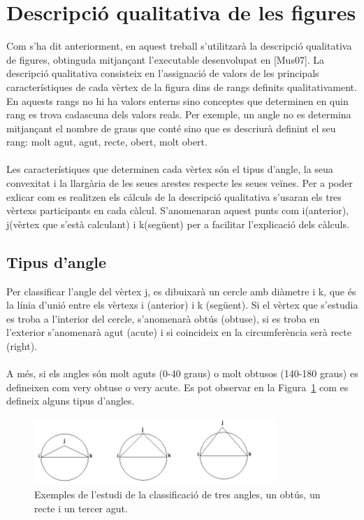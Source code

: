 \documentclass{article}
\begin{document}
\section{Descripció qualitativa de les figures}
Com s'ha dit anteriorment, en aquest treball s'utilitzarà la descripció qualitativa de figures, obtinguda mitjançant l'executable desenvolupat en [Mus07].
La descripció qualitativa consisteix en l'assignació de valors de les principals característiques de cada vèrtex de la figura dins de rangs definits qualitativament.
En aquests rangs no hi ha valors enterns sino conceptes que determinen en quin rang es trova cadascuna dels valors reals.
Per exemple, un angle no es determina mitjançant el nombre de graus que conté sino que es descriurà definint el seu rang: molt agut, agut, recte, obert, molt obert.
\\
\\
Les característiques que determinen cada vèrtex són el tipus d'angle, la seua convexitat i la llargària de les seues arestes respecte les seues veïnes.
Per a poder exlicar com es realitzen els cálculs de la descripció qualitativa s'usaran els tres vèrtexs participants en cada càlcul.
S'anomenaran aquest punts com i(anterior), j(vèrtex que s'està calculant) i k(següent) per a facilitar l'explicació dels càlculs.
\\
\subsection{Tipus d'angle}
Per classificar l'angle del vèrtex j, es dibuixarà un cercle amb diàmetre i k, que és la línia d'unió entre els vèrtexs i (anterior) i k (següent).
Si el vèrtex que s'estudia es troba a l'interior del cercle, s'anomenarà obtús (obtuse), si es troba en l'exterior s’anomenarà agut (acute) i si coincideix en la circumferència serà recte (right).
\\
\\
A més, si els angles són molt aguts (0-40 graus) o molt obtusos (140-180 graus) es defineixen com very obtuse o very acute.
Es pot observar en la Figura~\ref{fig:angles} com es defineix alguns tipus d'angles.
\\

\begin{figure}[h]
\centering
\includegraphics[width=260pt]{images/angles.png}
\caption {Exemples de l'estudi de la classificació de tres angles, un obtús, un recte i un tercer agut.}
\label {fig:angles}
\end{figure}
\end{document}

